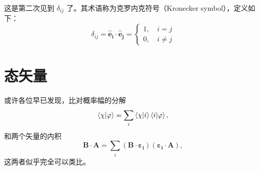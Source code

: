 \documentclass[12pt,a4paper,oneside]{book}
\begin{document}
\begin{tcolorbox}[before upper={\parindent20pt},title=\textit{Kronecker symbol},breakable,fontupper=\footnotesize,colframe=blue!40!white,colback=blue!5!white]
    这是第二次见到 $\delta_{ij}$ 了。其术语称为克罗内克符号（Kronecker symbol），定义如下：
    \begin{equation*}
        \delta_{ij}=\boldsymbol{\hat{e}_i\cdot \hat{e}_j}=\left\{\begin{aligned}
            1,\quad i=j\\
            0,\quad i\neq j
        \end{aligned}\right.       
    \end{equation*}
\end{tcolorbox}

\section{态矢量}

或许各位早已发现，比对概率幅的分解
\begin{equation*}
    \braket{\chi}{\varphi} = \sum_i \braket{\chi}{i}\braket{i}{\varphi},
\end{equation*}
和两个矢量的内积
\begin{equation*}
    \boldsymbol{B\cdot A}=\sum_i (\boldsymbol{B\cdot \varepsilon_i})(\boldsymbol{\varepsilon_i\cdot A}),
\end{equation*}
这两者似乎完全可以类比。
\end{document}
